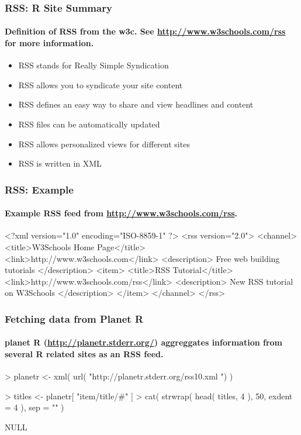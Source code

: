 \documentclass[smaller]{beamer}
\begin{document}
\begin{frame}[fragile]
\frametitle{RSS: R Site Summary}
\framesubtitle{Definition of RSS from the w3c. See \url{http://www.w3schools.com/rss} for more information. } 
    
\begin{itemize}
 \item RSS stands for Really Simple Syndication
 \item RSS allows you to syndicate your site content
 \item RSS defines an easy way to share and view headlines and content
 \item RSS files can be automatically updated
 \item RSS allows personalized views for different sites
 \item RSS is written in XML
\end{itemize}
\end{frame}


\begin{frame}[fragile]
\frametitle{RSS: Example}
\framesubtitle{Example RSS feed from \url{http://www.w3schools.com/rss}.}
\begin{semiverbatim}
<?xml version="1.0" encoding="ISO-8859-1" ?>
<rss version="2.0">
<channel>
  <title>W3Schools Home Page</title>
  <link>http://www.w3schools.com</link>
  <description>
     Free web building tutorials
  </description>
  <item>
    <title>RSS Tutorial</title>
    <link>http://www.w3schools.com/rss</link>
    <description>
        New RSS tutorial on W3Schools
    </description>
  </item>
</channel>
</rss>
\end{semiverbatim}

\end{frame}

\begin{frame}[fragile]
\frametitle{Fetching data from Planet R}
\framesubtitle{planet R (\url{http://planetr.stderr.org/}) aggreggates information from several R related sites as an RSS feed. }

\begin{Schunk}
\begin{Sinput}
> planetr <- xml( 
    url( "http://planetr.stderr.org/rss10.xml ") )
\end{Sinput}
\end{Schunk}
\begin{Schunk}
\begin{Sinput}
> titles <- planetr[ "item/title/#" ]
> cat( strwrap( head( titles, 4 ), 50, exdent = 4 ), 
    sep = "\n" )
\end{Sinput}
\begin{Soutput}
NULL
\end{Soutput}
\end{Schunk}
\end{frame}
\end{document}
